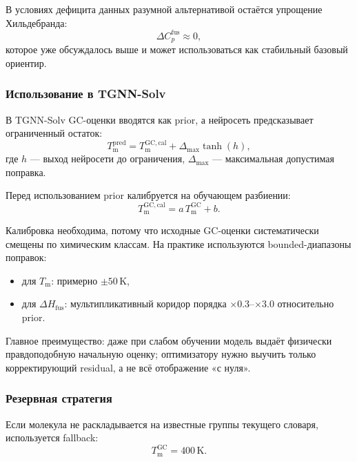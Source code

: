 \documentclass[11pt]{article}
\begin{document}
В условиях дефицита данных разумной альтернативой остаётся упрощение Хильдебранда:
\begin{equation*}
\Delta C_p^{\mathrm{fus}} \approx 0,
\end{equation*}
которое уже обсуждалось выше и может использоваться как стабильный базовый ориентир.

\subsubsection{Использование в TGNN-Solv}

В TGNN-Solv GC-оценки вводятся как prior, а нейросеть предсказывает ограниченный остаток:
\begin{equation*}
T_{\mathrm{m}}^{\mathrm{pred}} = T_{\mathrm{m}}^{\mathrm{GC,cal}} + \Delta_{\max}\tanh(h),
\end{equation*}
где $h$ --- выход нейросети до ограничения, $\Delta_{\max}$ --- максимальная допустимая поправка.

Перед использованием prior калибруется на обучающем разбиении:
\begin{equation*}
T_{\mathrm{m}}^{\mathrm{GC,cal}} = a\,T_{\mathrm{m}}^{\mathrm{GC}} + b.
\end{equation*}

Калибровка необходима, потому что исходные GC-оценки систематически смещены по химическим классам. На практике используются bounded-диапазоны поправок:
\begin{itemize}
  \item для $T_{\mathrm{m}}$: примерно $\pm50\,\mathrm{K}$,
  \item для $\Delta H_{\mathrm{fus}}$: мультипликативный коридор порядка $\times0.3$--$\times3.0$ относительно prior.
\end{itemize}

Главное преимущество: даже при слабом обучении модель выдаёт физически правдоподобную начальную оценку; оптимизатору нужно выучить только корректирующий residual, а не всё отображение «с нуля».

\subsubsection{Резервная стратегия}

Если молекула не раскладывается на известные группы текущего словаря, используется fallback:
\begin{equation*}
T_{\mathrm{m}}^{\mathrm{GC}} = 400\,\mathrm{K}.
\end{equation*}
\end{document}
